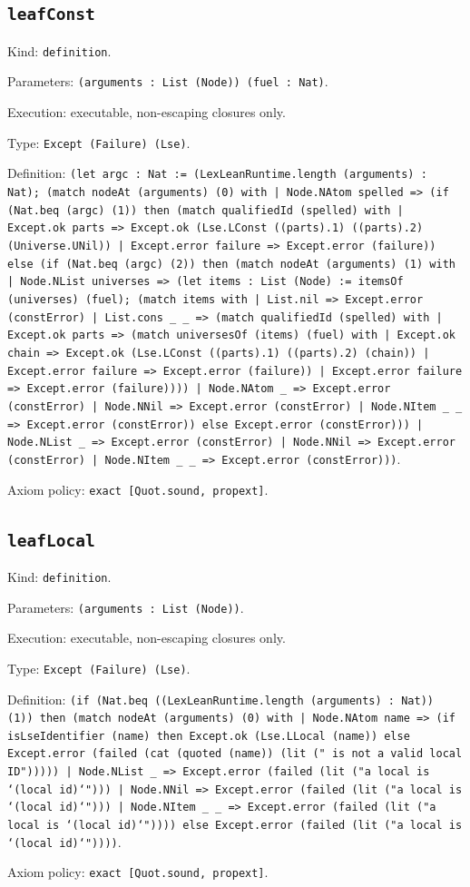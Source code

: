 \documentclass[11pt]{article}
\begin{document}
\subsection*{\texttt{leafConst}}
\noindent Kind: \texttt{definition}.\par
\noindent Parameters: \texttt{(arguments : List (Node)) (fuel : Nat)}.\par
\noindent Execution: executable, non-escaping closures only.\par
\noindent Type: \texttt{Except (Failure) (Lse)}.\par
\noindent Definition: \texttt{(let argc : Nat := (LexLeanRuntime.length (arguments) : Nat); (match nodeAt (arguments) (0) with | Node.NAtom spelled => (if (Nat.beq (argc) (1)) then (match qualifiedId (spelled) with | Except.ok parts => Except.ok (Lse.LConst ((parts).1) ((parts).2) (Universe.UNil)) | Except.error failure => Except.error (failure)) else (if (Nat.beq (argc) (2)) then (match nodeAt (arguments) (1) with | Node.NList universes => (let items : List (Node) := itemsOf (universes) (fuel); (match items with | List.nil => Except.error (constError) | List.cons \_ \_ => (match qualifiedId (spelled) with | Except.ok parts => (match universesOf (items) (fuel) with | Except.ok chain => Except.ok (Lse.LConst ((parts).1) ((parts).2) (chain)) | Except.error failure => Except.error (failure)) | Except.error failure => Except.error (failure)))) | Node.NAtom \_ => Except.error (constError) | Node.NNil => Except.error (constError) | Node.NItem \_ \_ => Except.error (constError)) else Except.error (constError))) | Node.NList \_ => Except.error (constError) | Node.NNil => Except.error (constError) | Node.NItem \_ \_ => Except.error (constError)))}.\par
\noindent Axiom policy: \texttt{exact [Quot.sound, propext]}.\par
\subsection*{\texttt{leafLocal}}
\noindent Kind: \texttt{definition}.\par
\noindent Parameters: \texttt{(arguments : List (Node))}.\par
\noindent Execution: executable, non-escaping closures only.\par
\noindent Type: \texttt{Except (Failure) (Lse)}.\par
\noindent Definition: \texttt{(if (Nat.beq ((LexLeanRuntime.length (arguments) : Nat)) (1)) then (match nodeAt (arguments) (0) with | Node.NAtom name => (if isLseIdentifier (name) then Except.ok (Lse.LLocal (name)) else Except.error (failed (cat (quoted (name)) (lit (" is not a valid local ID"))))) | Node.NList \_ => Except.error (failed (lit ("a local is `(local id)`"))) | Node.NNil => Except.error (failed (lit ("a local is `(local id)`"))) | Node.NItem \_ \_ => Except.error (failed (lit ("a local is `(local id)`")))) else Except.error (failed (lit ("a local is `(local id)`"))))}.\par
\noindent Axiom policy: \texttt{exact [Quot.sound, propext]}.\par
\end{document}
